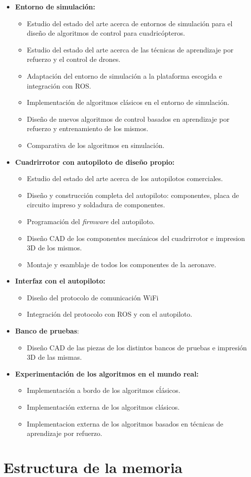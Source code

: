  \begin{itemize}
 	\item \textbf{Entorno de simulación:}
 	\begin{itemize}
 		\item Estudio del estado del arte acerca de entornos de simulación para el diseño de algoritmos de control para cuadricópteros.
 		\item Estudio del estado del arte acerca de las técnicas de aprendizaje por refuerzo y el control de drones.
 		\item Adaptación del entorno de simulación a la plataforma escogida e integración con ROS.
 		\item Implementación de algoritmos clásicos en el entorno de simulación.
 		\item Diseño de nuevos algoritmos de control basados en aprendizaje por refuerzo y entrenamiento de los mismos.
 		\item Comparativa de los algoritmos en simulación.
 	\end{itemize}
 	\item \textbf{Cuadrirrotor con autopiloto de diseño propio:}
 	\begin{itemize}
 		\item Estudio del estado del arte acerca de los autopilotos comerciales.
 		\item Diseño y construcción completa del autopiloto: componentes, placa de circuito impreso y soldadura de componentes.
 		\item Programación del \textit{firmware} del autopiloto.
 		\item Diseño CAD de los componentes mecánicos del cuadrirrotor e impresion 3D de los mismos.
 		\item Montaje y esamblaje de todos los componentes de la aeronave.  
 	\end{itemize}
 	\item \textbf{Interfaz con el autopiloto:}
 	\begin{itemize}
		\item Diseño del protocolo de comunicación WiFi
		\item Integración del protocolo con ROS y con el autopiloto.
	\end{itemize}
	\item \textbf{Banco de pruebas}:
		\begin{itemize}
			\item Diseño CAD de las piezas de los distintos bancos de pruebas e impresión 3D de las mismas. 
		\end{itemize}
	\item \textbf{Experimentación de los algoritmos en el mundo real:} 
		\begin{itemize}
			\item Implementación a bordo de los algoritmos cĺásicos.
			\item Implementación externa de los algoritmos clásicos.
			\item Implementacion externa de los algoritmos basados en técnicas de aprendizaje por refuerzo. 
		\end{itemize}
 \end{itemize}
\newpage
\section{Estructura de la memoria}